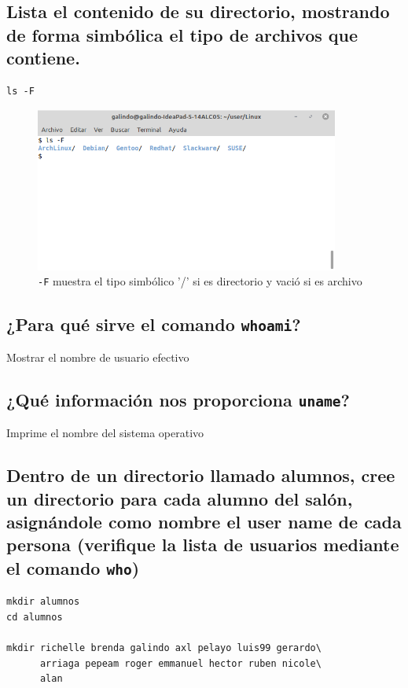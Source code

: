 \documentclass[11pt]{article}
\begin{document}
\pagebreak

\subsection{Lista el contenido de su directorio, mostrando de forma simbólica el tipo de archivos que contiene.}
\label{sec:org4788de0}
\begin{verbatim}
ls -F
\end{verbatim}

\begin{figure}[htbp]
\centering
\includegraphics[width=10cm]{img/8.png}
\caption{\texttt{-F} muestra el tipo simbólico '/' si es directorio y vació si es archivo}
\end{figure}

\pagebreak

\subsection{¿Para qué sirve el comando \texttt{whoami}?}
\label{sec:org96f95e2}
\begin{mdframed}
Mostrar el nombre de usuario efectivo
\end{mdframed}
\cite{linux_whoami} 

\subsection{¿Qué información nos proporciona \texttt{uname}?}
\label{sec:org496129e}
\begin{mdframed}
Imprime el nombre del sistema operativo
\end{mdframed}
\cite{OpenBSD_uname}

\subsection{Dentro de un directorio llamado alumnos, cree un directorio para cada alumno del salón, asignándole como nombre el user name de cada persona (verifique la lista de usuarios mediante el comando \texttt{who})}
\label{sec:orga3cf306}
\begin{verbatim}
mkdir alumnos
cd alumnos 

mkdir richelle brenda galindo axl pelayo luis99 gerardo\
      arriaga pepeam roger emmanuel hector ruben nicole\
      alan
\end{verbatim}
\end{document}
